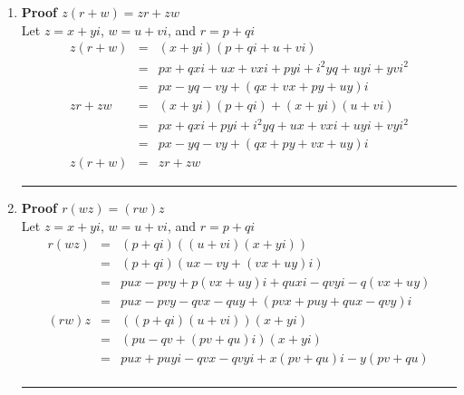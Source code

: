 \documentclass{article}%
\newenvironment{proof}[1][]{\begin{samepage}\textbf{Proof #1} }{\rule{0.5em}{0.5em} \end{samepage}}
\begin{document}
\begin{enumerate}
\begin{enumerate}[label*=\arabic*.]
\begin{enumerate}[label=\alph*]
\begin{proof}[$zw=wz$]
\begin{eqnarray*}
                      &=&ux+xvi+yui+yvi^2 \\
                      &=&ux-vy+(vx+uy)i \\
                    wz&=&(u+vi)(x+yi) \\
                      &=&ux+uyi+vxi+vyi^2 \\
                      &=&ux-vy+(vx+uy)i \\
                    zw&=&wz
                \end{eqnarray*}
            \end{proof}
            \item
            \begin{proof}[$z(r+w)=zr+zw$]
                \\ Let $z=x+yi$, $w=u+vi$, and $r=p+qi$
                \begin{eqnarray*}
                    z(r+w)&=&(x+yi)(p+qi+u+vi) \\
                          &=&px+qxi+ux+vxi+pyi+i^2yq+uyi+yvi^2 \\
                          &=&px-yq-vy+(qx+vx+py+uy)i \\
                    zr+zw &=&(x+yi)(p+qi)+(x+yi)(u+vi) \\
                          &=&px+qxi+pyi+i^2yq+ux+vxi+uyi+vyi^2 \\
                          &=&px-yq-vy+(qx+py+vx+uy)i \\
                    z(r+w)&=&zr+zw
                \end{eqnarray*}
            \end{proof}
            \item
            \begin{proof}[$r(wz)=(rw)z$]
                \\ Let $z=x+yi$, $w=u+vi$, and $r=p+qi$
                \begin{eqnarray*}
                    r(wz)&=&(p+qi)((u+vi)(x+yi)) \\
                         &=&(p+qi)(ux-vy+(vx+uy)i) \\
                         &=&pux-pvy+p(vx+uy)i+quxi-qvyi-q(vx+uy) \\
                         &=&pux-pvy-qvx-quy+(pvx+puy+qux-qvy)i \\
                    (rw)z&=&((p+qi)(u+vi))(x+yi) \\
                         &=&(pu-qv+(pv+qu)i)(x+yi) \\
                         &=&pux+puyi-qvx-qvyi+x(pv+qu)i-y(pv+qu) \\

\end{eqnarray*}
\end{proof}
\end{enumerate}
\end{enumerate}
\end{enumerate}
\end{document}
